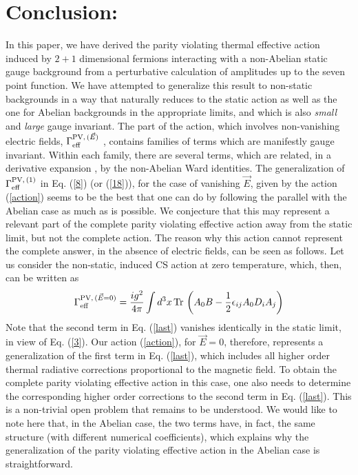 \documentclass[a4paper,12pt]{article}
\begin{document}
\section{Conclusion:}

In this paper, we have derived the parity violating thermal
effective action induced by $2+1$ dimensional fermions interacting
with a non-Abelian static gauge background from a perturbative
calculation of amplitudes up to the seven point function. We have attempted to
generalize this result to non-static backgrounds in a way that
naturally reduces to the static action as well as the one for Abelian
backgrounds in the appropriate limits, and which is also {\it small}
and {\it large} gauge invariant. The part of the action, which
involves non-vanishing electric fields, $\Gamma_{\rm eff}^{{\rm
    PV},\,(\vec{E})}$ , contains families of terms which are
manifestly gauge invariant. Within each family, there are several
terms, which are related, in a derivative expansion
\cite{Aitchison:1985pp,das:1987yb}, by the non-Abelian
Ward identities. The generalization of $\Gamma_{\rm eff}^{{\rm
    PV},\,(1)}$ in Eq. (\ref{8}) (or (\ref{18})), for the case of
vanishing $\vec{E}$, given by the
action (\ref{action}) seems to be the best that one can do by
following the parallel with the Abelian case as much as is
possible. We conjecture that this may represent a relevant part of the
complete parity violating effective action away from the static
limit, but not the complete action. The reason why this action cannot
represent  the complete answer,
in the absence of electric fields, can be seen as follows. Let us
consider the non-static, induced CS action at zero temperature, which,
then, can be written as
\begin{equation}
\Gamma_{\rm eff}^{{\rm PV},\,(\vec{E}=0)} = {ig^{2}\over 4\pi} \int
d^{3}x\,{\rm Tr}\,\left(A_{0}B - {1\over 2}
  \epsilon_{ij}A_{0}D_{i}A_{j}\right)\label{last}
\end{equation}
Note that the second term in Eq. (\ref{last}) vanishes identically in
the static limit, in view of Eq. (\ref{3}).
Our action (\ref{action}), for $\vec{E}=0$, therefore, represents a
generalization of the first term in Eq. (\ref{last}), which includes
all higher order thermal radiative corrections proportional to the
magnetic field. To obtain the complete parity violating effective
action in this case, one also needs to determine the corresponding
higher order corrections to the second term in Eq. (\ref{last}). This
is a non-trivial open problem that remains to be understood. We would
like to note here that, in the Abelian case, the two terms have, in
fact, the same structure (with different numerical coefficients),
which  explains why the generalization of the
parity violating effective action in the Abelian case is straightforward.
\end{document}
